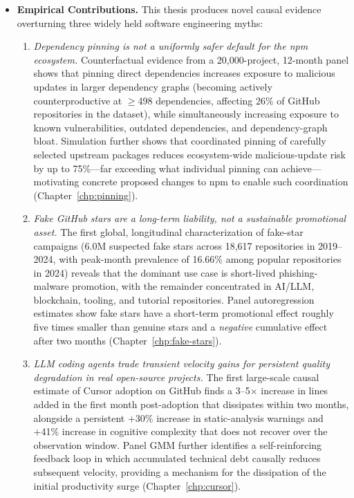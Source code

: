 \begin{itemize}[leftmargin=15pt]
    \item \textbf{Empirical Contributions.} This thesis produces novel causal evidence overturning three widely held software engineering myths:
    \begin{enumerate}[leftmargin=15pt, label=(\alph*)]
        \item \emph{Dependency pinning is not a uniformly safer default for the npm ecosystem.}
        Counterfactual evidence from a 20{,}000-project, 12-month panel shows that pinning direct dependencies increases exposure to malicious updates in larger dependency graphs (becoming actively counterproductive at $\geq$498 dependencies, affecting 26\% of GitHub repositories in the dataset), while simultaneously increasing exposure to known vulnerabilities, outdated dependencies, and dependency-graph bloat.
        Simulation further shows that coordinated pinning of carefully selected upstream packages reduces ecosystem-wide malicious-update risk by up to 75\%---far exceeding what individual pinning can achieve---motivating concrete proposed changes to npm to enable such coordination (Chapter~\ref{chp:pinning}).
        \item \emph{Fake GitHub stars are a long-term liability, not a sustainable promotional asset.}
        The first global, longitudinal characterization of fake-star campaigns (6.0M suspected fake stars across 18{,}617 repositories in 2019--2024, with peak-month prevalence of 16.66\% among popular repositories in 2024) reveals that the dominant use case is short-lived phishing-malware promotion, with the remainder concentrated in AI/LLM, blockchain, tooling, and tutorial repositories.
        Panel autoregression estimates show fake stars have a short-term promotional effect roughly five times smaller than genuine stars and a \emph{negative} cumulative effect after two months (Chapter~\ref{chp:fake-stars}).
        \item \emph{LLM coding agents trade transient velocity gains for persistent quality degradation in real open-source projects.}
        The first large-scale causal estimate of Cursor adoption on GitHub finds a 3--5$\times$ increase in lines added in the first month post-adoption that dissipates within two months, alongside a persistent +30\% increase in static-analysis warnings and +41\% increase in cognitive complexity that does not recover over the observation window.
        Panel GMM further identifies a self-reinforcing feedback loop in which accumulated technical debt causally reduces subsequent velocity, providing a mechanism for the dissipation of the initial productivity surge (Chapter~\ref{chp:cursor}).
    \end{enumerate}
\end{itemize}